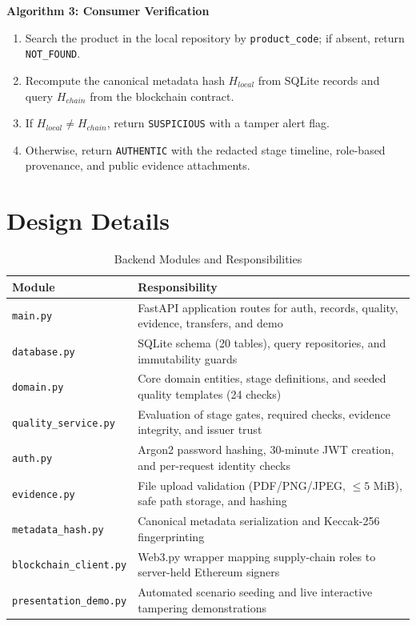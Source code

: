\documentclass[12pt,a4paper]{report}
\begin{document}
\vspace{0.3cm}
\noindent \textbf{Algorithm 3: Consumer Verification}
\begin{enumerate}[leftmargin=1.5em]
    \item Search the product in the local repository by \texttt{product\_code}; if absent, return \texttt{NOT\_FOUND}.
    \item Recompute the canonical metadata hash $H_{local}$ from SQLite records and query $H_{chain}$ from the blockchain contract.
    \item If $H_{local} \neq H_{chain}$, return \texttt{SUSPICIOUS} with a tamper alert flag.
    \item Otherwise, return \texttt{AUTHENTIC} with the redacted stage timeline, role-based provenance, and public evidence attachments.
\end{enumerate}

\section{Design Details}
\begin{table}[H]
\centering
\caption{Backend Modules and Responsibilities}
\label{tab:modules}
\small
\begin{tabularx}{\textwidth}{p{3.5cm} X}
\toprule
\textbf{Module} & \textbf{Responsibility} \\
\midrule
\texttt{main.py} & FastAPI application routes for auth, records, quality, evidence, transfers, and demo \\
\texttt{database.py} & SQLite schema (20 tables), query repositories, and immutability guards \\
\texttt{domain.py} & Core domain entities, stage definitions, and seeded quality templates (24 checks) \\
\texttt{quality\_service.py} & Evaluation of stage gates, required checks, evidence integrity, and issuer trust \\
\texttt{auth.py} & Argon2 password hashing, 30-minute JWT creation, and per-request identity checks \\
\texttt{evidence.py} & File upload validation (PDF/PNG/JPEG, $\le 5$ MiB), safe path storage, and hashing \\
\texttt{metadata\_hash.py} & Canonical metadata serialization and Keccak-256 fingerprinting \\
\texttt{blockchain\_client.py} & Web3.py wrapper mapping supply-chain roles to server-held Ethereum signers \\
\texttt{presentation\_demo.py} & Automated scenario seeding and live interactive tampering demonstrations \\
\bottomrule
\end{tabularx}
\end{table}
\end{document}
